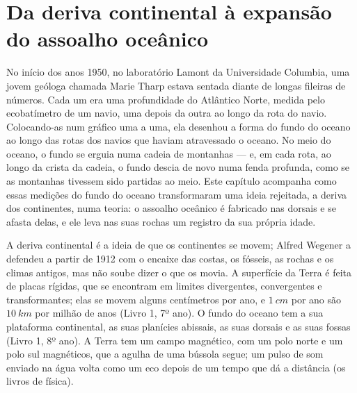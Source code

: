 \chapter{Da deriva continental à expansão do assoalho oceânico}\label{ch:g11:drift-to-spreading}

No início dos anos 1950, no laboratório Lamont da Universidade Columbia, uma
jovem geóloga chamada Marie Tharp estava sentada diante de longas fileiras
de números. Cada um era uma profundidade do Atlântico Norte, medida pelo
ecobatímetro de um navio, uma depois da outra ao longo da rota do navio.
Colocando-as num gráfico uma a uma, ela desenhou a forma do fundo do oceano
ao longo das rotas dos navios que haviam atravessado o oceano. No meio do
oceano, o fundo se erguia numa cadeia de montanhas --- e, em cada rota, ao
longo da crista da cadeia, o fundo descia de novo numa fenda profunda, como
se as montanhas tivessem sido partidas ao meio. Este capítulo acompanha como
essas medições do fundo do oceano transformaram uma ideia rejeitada, a
deriva dos continentes, numa teoria: o assoalho oceânico é fabricado nas
dorsais e se afasta delas, e ele leva nas suas rochas um registro da sua
própria idade.

\begin{recall}
A deriva continental é a ideia de que os continentes se movem; Alfred
Wegener a defendeu a partir de 1912 com o encaixe das costas, os fósseis, as
rochas e os climas antigos, mas não soube dizer o que os movia. A superfície
da Terra é feita de placas rígidas, que se encontram em limites divergentes,
convergentes e transformantes; elas se movem alguns centímetros por ano, e
$\qty{1}{cm}$ por ano são $\qty{10}{km}$ por milhão de anos (Livro 1, 7º
ano). O fundo do oceano tem a sua plataforma continental, as suas planícies
abissais, as suas dorsais e as suas fossas (Livro 1, 8º ano). A Terra tem um
campo magnético, com um polo norte e um polo sul magnéticos, que a agulha de
uma bússola segue; um pulso de som enviado na água volta como um eco depois
de um tempo que dá a distância (os livros de física).
\end{recall}

